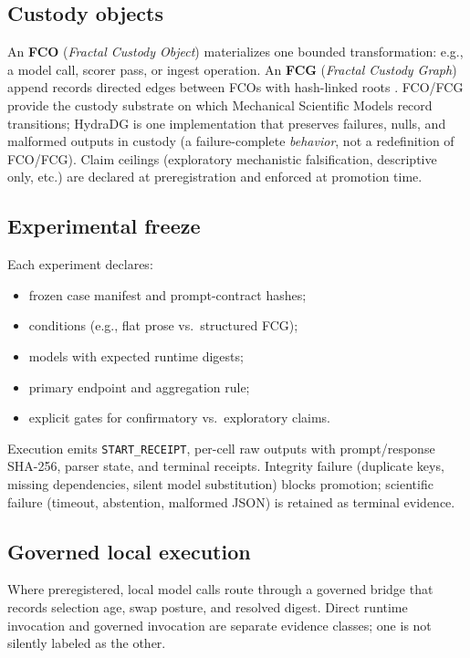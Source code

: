\documentclass{article}
\begin{document}
\subsection{Custody objects}

An \textbf{FCO} (\emph{Fractal Custody Object}) materializes one bounded transformation: e.g., a model call, scorer pass, or ingest operation.
An \textbf{FCG} (\emph{Fractal Custody Graph}) append records directed edges between FCOs with hash-linked roots \cite{laurie2013ct}.
FCO/FCG provide the custody substrate on which Mechanical Scientific Models record transitions; HydraDG is one implementation that preserves failures, nulls, and malformed outputs in custody (a failure-complete \emph{behavior}, not a redefinition of FCO/FCG).
Claim ceilings (exploratory mechanistic falsification, descriptive only, etc.) are declared at preregistration and enforced at promotion time.

\subsection{Experimental freeze}

Each experiment declares:
\begin{itemize}
  \item frozen case manifest and prompt-contract hashes;
  \item conditions (e.g., flat prose vs.\ structured FCG);
  \item models with expected runtime digests;
  \item primary endpoint and aggregation rule;
  \item explicit gates for confirmatory vs.\ exploratory claims.
\end{itemize}
Execution emits \texttt{START\_RECEIPT}, per-cell raw outputs with prompt/response SHA-256, parser state, and terminal receipts.
Integrity failure (duplicate keys, missing dependencies, silent model substitution) blocks promotion; scientific failure (timeout, abstention, malformed JSON) is retained as terminal evidence.

\subsection{Governed local execution}

Where preregistered, local model calls route through a governed bridge that records selection age, swap posture, and resolved digest.
Direct runtime invocation and governed invocation are separate evidence classes; one is not silently labeled as the other.
\end{document}
